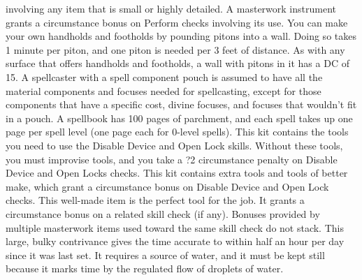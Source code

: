 involving any item that is small or highly detailed.
 A masterwork instrument grants a  circumstance bonus on Perform checks involving its use.
 You can make your own handholds and footholds by pounding pitons into a wall. Doing so takes 1 minute per piton, and one piton is needed per 3 feet of distance. As with any surface that offers handholds and footholds, a wall with pitons in it has a DC of 15.
 A spellcaster with a spell component pouch is assumed to have all the material components and focuses needed for spellcasting, except for those components that have a specific cost, divine focuses, and focuses that wouldn't fit in a pouch.
 A spellbook has 100 pages of parchment, and each spell takes up one page per spell level (one page each for 0-level spells).
 This kit contains the tools you need to use the Disable Device and Open Lock skills. Without these tools, you must improvise tools, and you take a ?2 circumstance penalty on Disable Device and Open Locks checks.
 This kit contains extra tools and tools of better make, which grant a  circumstance bonus on Disable Device and Open Lock checks.
 This well-made item is the perfect tool for the job. It grants a  circumstance bonus on a related skill check (if any). Bonuses provided by multiple masterwork items used toward the same skill check do not stack.
 This large, bulky contrivance gives the time accurate to within half an hour per day since it was last set. It requires a source of water, and it must be kept still because it marks time by the regulated flow of droplets of water.

